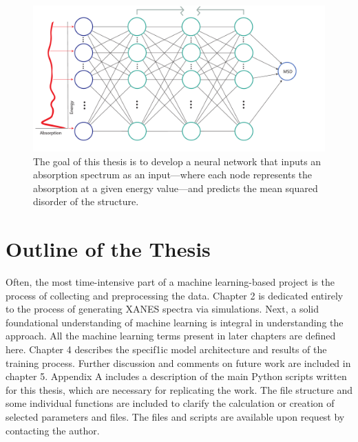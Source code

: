 \begin{figure}[h!]
    \centering
    \includegraphics[width=\linewidth]{Chapters/Figures/thesis-design.pdf}
    \caption[Project Approach]{The goal of this thesis is to develop a neural network that inputs an absorption spectrum as an input---where each node represents the absorption at a given energy value---and predicts the mean squared disorder of the structure.}
\end{figure}

\section{Outline of the Thesis}
Often, the most time-intensive part of a machine learning-based project is the process of collecting and preprocessing the data. Chapter 2 is dedicated entirely to the process of generating XANES spectra via simulations. Next, a solid foundational understanding of machine learning is integral in understanding the approach. All the machine learning terms present in later chapters are defined here.  Chapter 4 describes the specif1ic model architecture and results of the training process. Further discussion and comments on future work are included in chapter 5. Appendix A includes a description of the main Python scripts written for this thesis, which are necessary for replicating the work. The file structure and some individual functions are included to clarify the calculation or creation of selected parameters and files. The files and scripts are available upon request by contacting the author.
